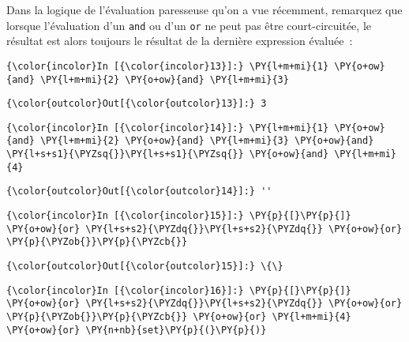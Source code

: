     Dans la logique de l'évaluation paresseuse qu'on a vue récemment,
remarquez que lorsque l'évaluation d'un \texttt{and} ou d'un \texttt{or}
ne peut pas être court-circuitée, le résultat est alors toujours le
résultat de la dernière expression évaluée~:

    \begin{Verbatim}[commandchars=\\\{\}]
{\color{incolor}In [{\color{incolor}13}]:} \PY{l+m+mi}{1} \PY{o+ow}{and} \PY{l+m+mi}{2} \PY{o+ow}{and} \PY{l+m+mi}{3}
\end{Verbatim}


\begin{Verbatim}[commandchars=\\\{\}]
{\color{outcolor}Out[{\color{outcolor}13}]:} 3
\end{Verbatim}
            
    \begin{Verbatim}[commandchars=\\\{\}]
{\color{incolor}In [{\color{incolor}14}]:} \PY{l+m+mi}{1} \PY{o+ow}{and} \PY{l+m+mi}{2} \PY{o+ow}{and} \PY{l+m+mi}{3} \PY{o+ow}{and} \PY{l+s+s1}{\PYZsq{}}\PY{l+s+s1}{\PYZsq{}} \PY{o+ow}{and} \PY{l+m+mi}{4}
\end{Verbatim}


\begin{Verbatim}[commandchars=\\\{\}]
{\color{outcolor}Out[{\color{outcolor}14}]:} ''
\end{Verbatim}
            
    \begin{Verbatim}[commandchars=\\\{\}]
{\color{incolor}In [{\color{incolor}15}]:} \PY{p}{[}\PY{p}{]} \PY{o+ow}{or} \PY{l+s+s2}{\PYZdq{}}\PY{l+s+s2}{\PYZdq{}} \PY{o+ow}{or} \PY{p}{\PYZob{}}\PY{p}{\PYZcb{}}
\end{Verbatim}


\begin{Verbatim}[commandchars=\\\{\}]
{\color{outcolor}Out[{\color{outcolor}15}]:} \{\}
\end{Verbatim}
            
    \begin{Verbatim}[commandchars=\\\{\}]
{\color{incolor}In [{\color{incolor}16}]:} \PY{p}{[}\PY{p}{]} \PY{o+ow}{or} \PY{l+s+s2}{\PYZdq{}}\PY{l+s+s2}{\PYZdq{}} \PY{o+ow}{or} \PY{p}{\PYZob{}}\PY{p}{\PYZcb{}} \PY{o+ow}{or} \PY{l+m+mi}{4} \PY{o+ow}{or} \PY{n+nb}{set}\PY{p}{(}\PY{p}{)}
\end{Verbatim}


